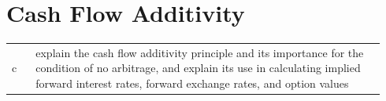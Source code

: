
\section{Cash Flow Additivity}
\label{sec:Cash Flow Additivity}
\begin{center}
\begin{tabular}{p{0.06\linewidth} | p{0.88\linewidth}}
	c & explain the cash flow additivity principle and its importance for the condition of no arbitrage, and explain its use in calculating implied forward interest rates, forward exchange rates, and option values \\
\end{tabular}
\end{center}

